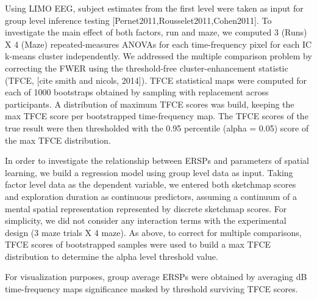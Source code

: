 Using LIMO EEG, subject estimates from the first level were taken as input for group level inference testing [Pernet2011,Rousselet2011,Cohen2011]. To investigate the main effect of both factors, run and maze, we computed 3 (Runs) X 4 (Maze) repeated-measures ANOVAs for each time-frequency pixel for each IC k-means cluster independently. We addressed the multiple comparison problem by correcting the FWER using the threshold-free cluster-enhancement statistic (TFCE, [cite smith and nicols, 2014]). TFCE statistical maps were computed for each of 1000 bootstraps obtained by sampling with replacement across participants. A distribution of maximum TFCE scores was build, keeping the max TFCE score per bootstrapped time-frequency map. The TFCE scores of the true result were then thresholded with the 0.95 percentile (alpha = 0.05) score of the max TFCE distribution.

In order to investigate the relationship between ERSPs and parameters of spatial learning, we build a regression model using group level data as input. Taking factor level data as the dependent variable, we entered both sketchmap scores and exploration duration as continuous predictors, assuming a continuum of a mental spatial representation represented by discrete sketchmap scores. For simplicity, we did not consider any interaction terms with the experimental design (3 maze trials X 4 maze). As above, to correct for multiple comparisons, TFCE scores of bootstrapped samples were used to build a max TFCE distribution to determine the alpha level threshold value.

For visualization purposes, group average ERSPs were obtained by averaging dB time-frequency maps significance masked by threshold surviving TFCE scores.
